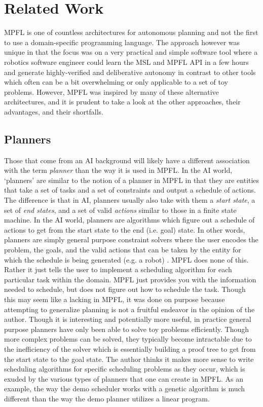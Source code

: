 \section{Related Work}
MPFL is one of countless architectures for autonomous planning and not the first to use a domain-specific programming language. The approach however was unique in that the focus was on a very practical and simple software tool where a robotics software engineer could learn the MSL and MPFL API in a few hours and generate highly-verified and deliberative autonomy in contrast to other tools which often can be a bit overwhelming or only applicable to a set of toy problems. However, MPFL was inspired by many of these alternative architectures, and it is prudent to take a look at the other approaches, their advantages, and their shortfalls.

\subsection{Planners}
Those that come from an AI background will likely have a different association with the term \emph{planner} than the way it is used in MPFL. In the AI world, `planners' are similar to the notion of a planner in MPFL in that they are entities that take a set of tasks and a set of constraints and output a schedule of actions. The difference is that in AI, planners usually also take with them a \emph{start state}, a set of \emph{end states}, and a set of valid \emph{actions} similar to those in a finite state machine. In the AI world, planners are algorithms which figure out a schedule of actions to get from the start state to the end (i.e. goal) state. In other words, planners are simply general purpose constraint solvers where the user encodes the problem, the goals, and the valid actions that can be taken by the entity for which the schedule is being generated (e.g. a robot) \citep{russellnorvig:ai}. MPFL does none of this. Rather it just tells the user to implement a scheduling algorithm for each particular task within the domain. MPFL just provides you with the information needed to schedule, but does not figure out how to schedule the task. Though this may seem like a lacking in MPFL, it was done on purpose because attempting to generalize planning is not a fruitful endeavor in the opinion of the author. Though it is interesting and potentially more useful, in practice general purpose planners have only been able to solve toy problems efficiently. Though more complex problems can be solved, they typically become intractable due to the inefficiency of the solver which is essentially building a proof tree to get from the start state to the goal state. The author thinks it makes more sense to write scheduling algorithms for specific scheduling problems as they occur, which is exuded by the various types of planners that one can create in MPFL. As an example, the way the demo  scheduler works with a genetic algorithm is much different than the way the demo  planner utilizes a linear program. 

